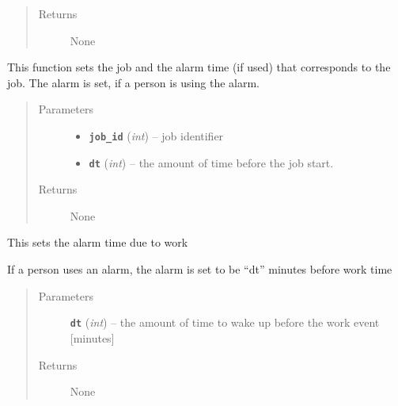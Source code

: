 \documentclass[letterpaper,10pt,english]{sphinxmanual}
\begin{document}
\begin{fulllineitems}
\begin{fulllineitems}
\begin{quote}
\begin{description}
\item[{Returns}] \leavevmode
None

\end{description}\end{quote}

\end{fulllineitems}


\begin{fulllineitems}
\label{social:social.Social.set_job}
This function sets the job and the alarm time (if used) that corresponds to the job. The alarm  is set,         if a person is using the alarm.
\begin{quote}\begin{description}
\item[{Parameters}] \leavevmode\begin{itemize}
\item {} 
\textbf{\texttt{job\_id}} (\emph{int}) -- job identifier

\item {} 
\textbf{\texttt{dt}} (\emph{int}) -- the amount of time before the job start.

\end{itemize}

\item[{Returns}] \leavevmode
None

\end{description}\end{quote}

\end{fulllineitems}


\begin{fulllineitems}
\label{social:social.Social.set_work_alarm}
This sets the alarm time due to work

If a person uses an alarm, the alarm is set to be ``dt'' minutes before work time
\begin{quote}\begin{description}
\item[{Parameters}] \leavevmode
\textbf{\texttt{dt}} (\emph{int}) -- the amount of time to wake up before the work event {[}minutes{]}

\item[{Returns}] \leavevmode
None


\end{description}
\end{quote}
\end{fulllineitems}
\end{fulllineitems}
\end{document}
